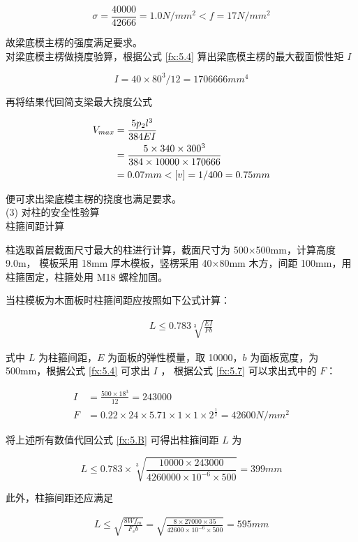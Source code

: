 \[
    \sigma = \frac{40000}{42666}=1.0 N/mm^2< f=17N/mm^2
\]

故梁底模主楞的强度满足要求。\\

对梁底模主楞做挠度验算，根据公式 \ref{fx:5.4} 算出梁底模主楞的最大截面惯性矩 $I$

\[
    I=40\times 80^3 /12=1706666 mm^4
\]

再将结果代回简支梁最大挠度公式 

\begin{align}
    V_{max}&=\frac{5p_2l^3}{384EI}\\
    &=\frac{5\times 340\times 300^3}{384\times 10000\times 170666} \notag \\
    &=0.07mm<[v]=1/400=0.75mm \notag
\end{align}

便可求出梁底模主楞的挠度也满足要求。\\

(3) 对柱的安全性验算\\

 柱箍间距计算

柱选取首层截面尺寸最大的柱进行计算，截面尺寸为 500×500mm，计算高度 9.0m， 模板采用 18mm 厚木模板，竖楞采用 40×80mm 木方，间距 100mm，用柱箍固定，柱箍处用 M18 螺栓加固。

当柱模板为木面板时柱箍间距应按照如下公式计算：

\begin{align}
    \label{fx:5.B}
    L \leq 0.783\sqrt[3]{\frac{EI}{Fb}}
\end{align}

式中 $L$ 为柱箍间距，$E$ 为面板的弹性模量，取 10000，$b$ 为面板宽度，为 500mm，根据公式 \ref{fx:5.4} 可求出 $I$ ，
根据公式 \ref{fx:5.7} 可以求出式中的 $F$：

\begin{align*}
I&=\frac{500\times 18^3}{12}=243000\\
F&=0.22\times 24\times 5.71\times 1\times 1\times 2^{\frac{1}{2}}=42600 N/mm^2
\end{align*}

将上述所有数值代回公式 \ref{fx:5.B} 可得出柱箍间距 $L$ 为

\[L \leq 0.783\times \sqrt[3]{\frac{10000\times 243000}{4260000\times 10^{-6}\times 500}}=399mm\]

此外，柱箍间距还应满足

\begin{align}
    \label{fx:5.C}
    L \leq \sqrt{\frac{8Wf_m}{F_sb}}=\sqrt{\frac{8\times 27000\times 35}{42600\times 10^{-6}\times 500}}=595 mm
\end{align}

